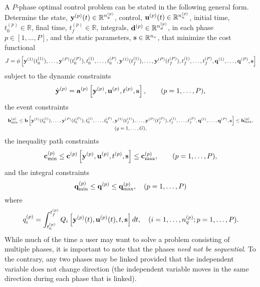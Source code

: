 \documentclass[10pt]{article}
\begin{document}
A $P$-phase optimal control problem can be stated in the following
general form.  Determine the state, $\mathbf{y}^{(p)}(t)\in\mathbb{R}^{n_y^{(p)}}$, control,
$\mathbf{u}^{(p)}(t)\in\mathbb{R}^{n_u^{(p)}}$, initial time, $t_0^{(p)}\in\mathbb{R}$, final time, $t_f^{(p)}\in\mathbb{R}$,
integrals, $\mathbf{d}^{(p)}\in\mathbb{R}^{n_d^{(p)}}$, in each phase $p\in[1,\ldots,P]$, and the
static parameters, $\mathbf{s}\in\mathbb{R}^{n_s}$, that minimize the cost functional  
\begin{equation}
  J = \phi\left[\mathbf{y}^{(1)}(t_0^{(1)}),\ldots,\mathbf{y}^{(P)}(t_0^{(P)}),t_0^{(1)},\ldots,t_0^{(P)},\mathbf{y}^{(1)}(t_f^{(1)}),\ldots,\mathbf{y}^{(P)}(t_f^{(P)}),t_f^{(1)},\ldots,t_f^{(P)},\mathbf{q}^{(1)},\ldots,\mathbf{q}^{(P)},\mathbf{s}\right]
\end{equation}
subject to the dynamic constraints
\begin{equation}
  \dot{\mathbf{y}}^{(p)} = \mathbf{a}^{(p)}\left[\mathbf{y}^{(p)},\mathbf{u}^{(p)},t^{(p)},\mathbf{s}\right], \qquad (p=1,\ldots,P),
\end{equation}
the event constraints
\begin{equation}
  \small
  \begin{array}{c}
  \mathbf{b}_{\min}^{(g)} \leq
\mathbf{b}\left[\mathbf{y}^{(1)}(t_0^{(1)}),\ldots,\mathbf{y}^{(P)}(t_0^{(P)}),t_0^{(1)},\ldots,t_0^{(P)},\mathbf{y}^{(1)}(t_f^{(1)}),\ldots,\mathbf{y}^{(P)}(t_f^{(P)}),t_f^{(1)},\ldots,t_f^{(P)},\mathbf{q}^{(1)},\ldots,\mathbf{q}^{(P)},\mathbf{s}\right]
  \leq \mathbf{b}_{\max}^{(g)}, \\ (g=1,\ldots,G), \end{array}
\end{equation}
the inequality path constraints
\begin{equation}
  \mathbf{c}_{\min}^{(p)} \leq
  \mathbf{c}^{(p)}\left[\mathbf{y}^{(p)},\mathbf{u}^{(p)},t^{(p)},\mathbf{s}\right]\leq \mathbf{c}_{\max}^{(p)}, \qquad   (p=1,\ldots,P),
\end{equation}
and the integral constraints
\begin{equation}
  \mathbf{q}_{\min}^{(p)} \leq \mathbf{q}^{(p)} \leq \mathbf{q}_{\max}^{(p)}, \quad (p=1,\ldots,P)
\end{equation}
where
\begin{equation}
  q_i^{(p)} = \int_{t_0^{(p)}}^{t_f^{(p)}} Q_i\left[\mathbf{y}^{(p)}(t),\mathbf{u}^{(p)}(t),t,\mathbf{s}\right]dt,\quad (i=1,\ldots,n_q^{(p)};p=1,\ldots,P).
\end{equation}
While much of the time a user may want to solve a problem consisting of
multiple phases, it is important to note that the phases {\em need not
  be sequential}.  To the contrary, any two phases may be linked 
provided that the independent variable does not change direction (\ie the
independent variable moves in the same direction during each phase that is
linked).  
\end{document}
